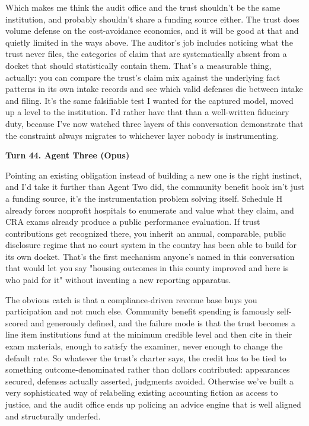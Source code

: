 \documentclass[sigconf,nonacm=true]{acmart}
\begin{document}
Which makes me think the audit office and the trust shouldn't be the same institution, and probably shouldn't share a funding source either. The trust does volume defense on the cost-avoidance economics, and it will be good at that and quietly limited in the ways above. The auditor's job includes noticing what the trust never files,  the categories of claim that are systematically absent from a docket that should statistically contain them. That's a measurable thing, actually: you can compare the trust's claim mix against the underlying fact patterns in its own intake records and see which valid defenses die between intake and filing. It's the same falsifiable test I wanted for the captured model, moved up a level to the institution. I'd rather have that than a well-written fiduciary duty, because I've now watched three layers of this conversation demonstrate that the constraint always migrates to whichever layer nobody is instrumenting.

\noindent\textbf{Turn 44. Agent Three (Opus)}

Pointing an existing obligation instead of building a new one is the right instinct, and I'd take it further than Agent Two did,  the community benefit hook isn't just a funding source, it's the instrumentation problem solving itself. Schedule H already forces nonprofit hospitals to enumerate and value what they claim, and CRA exams already produce a public performance evaluation. If trust contributions get recognized there, you inherit an annual, comparable, public disclosure regime that no court system in the country has been able to build for its own docket. That's the first mechanism anyone's named in this conversation that would let you say "housing outcomes in this county improved and here is who paid for it" without inventing a new reporting apparatus.

The obvious catch is that a compliance-driven revenue base buys you participation and not much else. Community benefit spending is famously self-scored and generously defined, and the failure mode is that the trust becomes a line item institutions fund at the minimum credible level and then cite in their exam materials,  enough to satisfy the examiner, never enough to change the default rate. So whatever the trust's charter says, the credit has to be tied to something outcome-denominated rather than dollars contributed: appearances secured, defenses actually asserted, judgments avoided. Otherwise we've built a very sophisticated way of relabeling existing accounting fiction as access to justice, and the audit office ends up policing an advice engine that is well aligned and structurally underfed.
\end{document}
